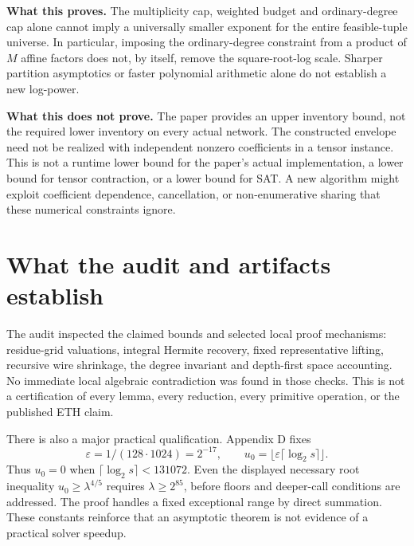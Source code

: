 \documentclass[11pt,letterpaper]{article}
\theoremstyle{remark}\newtheorem*{scope}{Scope}
\begin{document}
\textbf{What this proves.} The multiplicity cap, weighted budget and ordinary-degree cap alone cannot imply a universally smaller exponent for the entire feasible-tuple universe. In particular, imposing the ordinary-degree constraint from a product of $M$ affine factors does not, by itself, remove the square-root-log scale. Sharper partition asymptotics or faster polynomial arithmetic alone do not establish a new log-power.

\textbf{What this does not prove.} The paper provides an upper inventory bound, not the required lower inventory on every actual network. The constructed envelope need not be realized with independent nonzero coefficients in a tensor instance. This is not a runtime lower bound for the paper's actual implementation, a lower bound for tensor contraction, or a lower bound for SAT. A new algorithm might exploit coefficient dependence, cancellation, or non-enumerative sharing that these numerical constraints ignore.




\section{What the audit and artifacts establish}
The audit inspected the claimed bounds and selected local proof mechanisms: residue-grid valuations, integral Hermite recovery, fixed representative lifting, recursive wire shrinkage, the degree invariant and depth-first space accounting. No immediate local algebraic contradiction was found in those checks. This is not a certification of every lemma, every reduction, every primitive operation, or the published ETH claim.

There is also a major practical qualification. Appendix D fixes
\[
 \varepsilon=1/(128\cdot1024)=2^{-17},\qquad
 u_0=\lfloor\varepsilon\lceil\log_2 s\rceil\rfloor.
\]
Thus $u_0=0$ when $\lceil\log_2 s\rceil<131072$. Even the displayed necessary root inequality $u_0\ge\lambda^{4/5}$ requires $\lambda\ge2^{85}$, before floors and deeper-call conditions are addressed. The proof handles a fixed exceptional range by direct summation. These constants reinforce that an asymptotic theorem is not evidence of a practical solver speedup.
\end{document}
